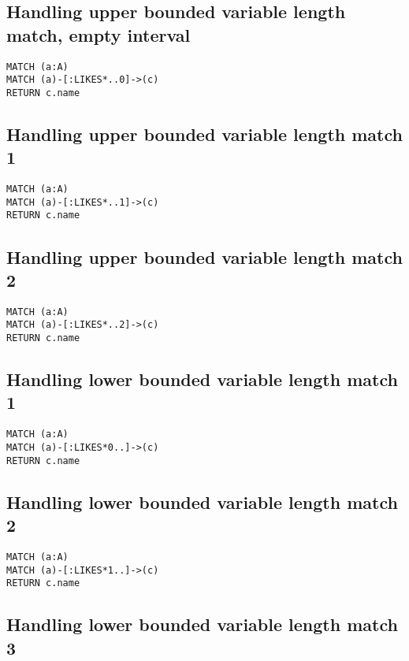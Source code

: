 \subsection{Handling upper bounded variable length match, empty interval}

\begin{lstlisting}
MATCH (a:A)
MATCH (a)-[:LIKES*..0]->(c)
RETURN c.name
\end{lstlisting}

\subsection{Handling upper bounded variable length match 1}

\begin{lstlisting}
MATCH (a:A)
MATCH (a)-[:LIKES*..1]->(c)
RETURN c.name
\end{lstlisting}

\subsection{Handling upper bounded variable length match 2}

\begin{lstlisting}
MATCH (a:A)
MATCH (a)-[:LIKES*..2]->(c)
RETURN c.name
\end{lstlisting}

\subsection{Handling lower bounded variable length match 1}

\begin{lstlisting}
MATCH (a:A)
MATCH (a)-[:LIKES*0..]->(c)
RETURN c.name
\end{lstlisting}

\subsection{Handling lower bounded variable length match 2}

\begin{lstlisting}
MATCH (a:A)
MATCH (a)-[:LIKES*1..]->(c)
RETURN c.name
\end{lstlisting}

\subsection{Handling lower bounded variable length match 3}

